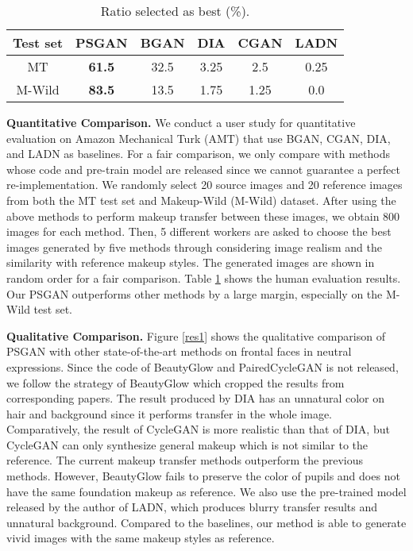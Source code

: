 \begin{table}[!t]
    \centering
    \begin{tabular}{@{}cccccc@{}}
      \toprule
      Test set & PSGAN & BGAN & DIA & CGAN & LADN\\ \midrule
      MT       &  \textbf{61.5}  &  32.5 &  3.25 & 2.5  &  0.25 \\ \midrule
      M-Wild   & \textbf{83.5} & 13.5 & 1.75 & 1.25 & 0.0 \\ \bottomrule
    \end{tabular}
    \vspace{1mm}
    \caption{Ratio selected as best (\%).}
    \label{t2}
    \vspace{-4mm}
\end{table}

\textbf{Quantitative Comparison.} We conduct a user study for quantitative evaluation on Amazon Mechanical Turk (AMT) that use BGAN, CGAN, DIA, and LADN as baselines. For a fair comparison, we only compare with methods whose code and pre-train model are released since we cannot guarantee a perfect re-implementation. We randomly select 20 source images and 20 reference images from both the MT test set and Makeup-Wild (M-Wild) dataset. After using the above methods to perform makeup transfer between these images, we obtain 800 images for each method. Then, 5 different workers are asked to choose the best images generated by five methods through considering image realism and the similarity with reference makeup styles. The generated images are shown in random order for a fair comparison. Table \ref{t2} shows the human evaluation results. Our PSGAN outperforms other methods by a large margin, especially on the M-Wild test set.

\textbf{Qualitative Comparison.} Figure \ref{res1} shows the qualitative comparison of PSGAN with other state-of-the-art methods on frontal faces in neutral expressions. Since the code of BeautyGlow and PairedCycleGAN is not released, we follow the strategy of BeautyGlow which cropped the results from corresponding papers. 
The result produced by DIA has an unnatural color on hair and background since it performs transfer in the whole image.
Comparatively, the result of CycleGAN is more realistic than that of DIA, but CycleGAN can only synthesize general makeup which is not similar to the reference.
The current makeup transfer methods outperform the previous methods. However, BeautyGlow fails to preserve the color of pupils and does not have the same foundation makeup as reference. We also use the pre-trained model released by the author of LADN, which produces blurry transfer results and unnatural background.
Compared to the baselines, our method is able to generate vivid images with the same makeup styles as reference.

